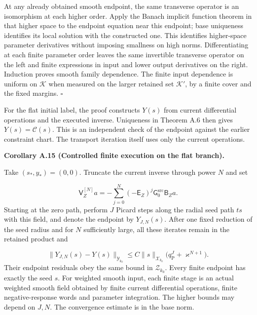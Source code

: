 \documentclass[
  english,
  11pt,
  reqno]{amsart}
\makeatletter
\newcommand{\pandocstatementheading}[1]{%
  \par\addpenalty{\@beginparpenalty}%
  \addvspace{.5\baselineskip plus .2\baselineskip minus .2\baselineskip}%
  {\normalfont\bfseries #1\par}%
  \nobreak\@afterindenttrue\@afterheading
}
\makeatother
\begin{document}
At any already obtained smooth endpoint, the same transverse operator is
an isomorphism at each higher order. Apply the Banach implicit function
theorem in that higher space to the endpoint equation near this
endpoint; base uniqueness identifies its local solution with the
constructed one. This identifies higher-space parameter derivatives
without imposing smallness on high norms. Differentiating at each finite
parameter order leaves the same invertible transverse operator on the
left and finite expressions in input and lower output derivatives on the
right. Induction proves smooth family dependence. The finite input
dependence is uniform on \(\mathcal K\) when measured on the larger
retained set \(\mathcal K'\), by a finite cover and the fixed margins.
\hfill\(\square\)

For the flat initial label, the proof constructs \(Y(s)\) from current
differential operations and the executed inverse. Uniqueness in Theorem
A.6 then gives \(Y(s)=\mathcal C(s)\). This is an independent check of
the endpoint against the earlier constraint chart. The transport
iteration itself uses only the current operations.

\pandocstatementheading{\leavevmode{}\label{cor:online-current-finite-neumann-picard}Corollary A.15 (Controlled finite execution on the flat branch).}

Take \((s_*,y_*)=(0,0)\). Truncate the current inverse through power
\(N\) and set

\label{eq:online-current-finite-neumann-field} \[
\mathsf V_Z^{[N]}a
=-\sum_{j=0}^{N}(-\mathsf E_Z)^j
\mathsf G_0^{\mathrm{src}}\mathsf B_Za.
\] Starting at the zero path, perform \(J\) Picard steps along the
radial seed path \(ts\) with this field, and denote the endpoint by
\(Y_{J,N}(s)\). After one fixed reduction of the seed radius and for
\(N\) sufficiently large, all these iterates remain in the retained
product and

\label{eq:online-current-finite-execution-error} \[
\|Y_{J,N}(s)-Y(s)\|_{\mathcal Y_{k_0}}
\le C\|s\|_{\mathcal X_{k_0}}
\bigl(q_{\mathrm P}^{J}+\varkappa^{N+1}\bigr).
\] Their endpoint residuals obey the same bound in \(\mathcal Z_{k_0}\).
Every finite endpoint has exactly the seed \(s\). For weighted smooth
input, each finite stage is an actual weighted smooth field obtained by
finite current differential operations, finite negative-response words
and parameter integration. The higher bounds may depend on \(J,N\). The
convergence estimate is in the base norm.
\end{document}
